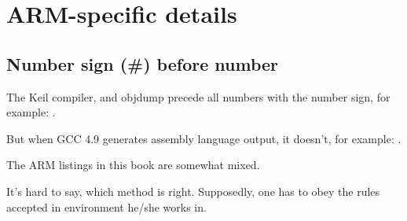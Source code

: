﻿\chapter{ARM-specific details}

\section{Number sign (\#) before number}

The Keil compiler, \IDA and objdump precede all numbers with the \q{\#} number sign, for example:
.

But when GCC 4.9 generates assembly language output, it doesn't, for example: 
.

The ARM listings in this book are somewhat mixed.

It's hard to say, which method is right.
Supposedly, one has to obey the rules accepted in environment he/she works in.




